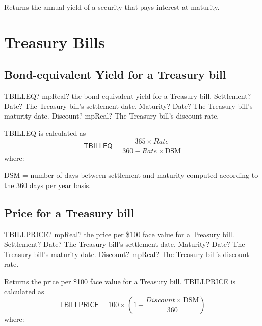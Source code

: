 \vspace{0.3cm}
Returns the annual yield of a security that pays interest at maturity.














\newpage
\section{Treasury  Bills}

\subsection{Bond-equivalent Yield for a Treasury bill}


\begin{mpFunctionsExtract}
	\mpWorksheetFunctionThreeNotImplemented
	{TBILLEQ? mpReal? the bond-equivalent yield for a Treasury bill.}
	{Settlement? Date?  The Treasury bill's settlement date.}
	{Maturity? Date? The Treasury bill's maturity date.}
	{Discount? mpReal? The Treasury bill's discount rate.}
\end{mpFunctionsExtract}


\vspace{0.3cm}
TBILLEQ is calculated as
\begin{equation}
\textsf{TBILLEQ} = \frac{365 \times Rate}{360- Rate \times \text{DSM}} 
\end{equation}
where:

DSM  = number of days between settlement and maturity computed according to the 360 days per year basis.



\subsection{Price for a Treasury bill}

\begin{mpFunctionsExtract}
	\mpWorksheetFunctionThreeNotImplemented
	{TBILLPRICE? mpReal? the price per \$100 face value for a Treasury bill.}
	{Settlement? Date?  The Treasury bill's settlement date.}
	{Maturity? Date? The Treasury bill's maturity date.}
	{Discount? mpReal? The Treasury bill's discount rate.}
\end{mpFunctionsExtract}

\vspace{0.3cm}
Returns the price per \$100 face value for a Treasury bill. TBILLPRICE is calculated as
\begin{equation}
\textsf{TBILLPRICE} = 100 \times \left(1- \frac{Discount \times\text{DSM}}{360} \right)
\end{equation}
where:

